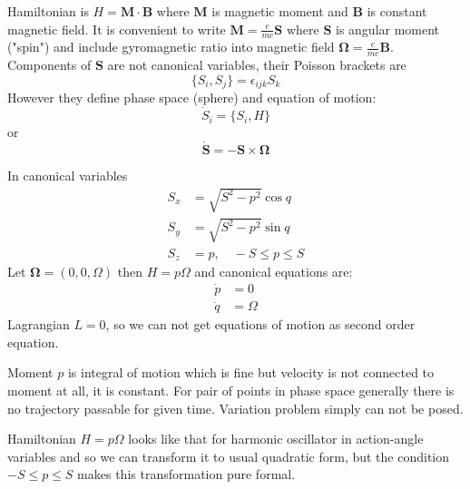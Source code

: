 Hamiltonian is $ H=\bm M \cdot \bm B $ where $\bm M$ is magnetic moment 
and $ \bm B $ is constant magnetic field.
It is convenient to write $ \bm M=\frac{e}{m c}\bm S $ where $ \bm S $
is angular moment ("spin")  and  include gyromagnetic ratio into magnetic field
$ \bm \Omega = \frac{e}{m c}\bm B$. Components of $ \bm S $ are not
canonical variables, their Poisson brackets are
\begin{equation}
   \label {pb}
    \{S_i,S_j\}= \epsilon_{ijk} S_k
\end{equation}
However they define phase space (sphere)  and equation of motion:
\begin{equation}
   \label {sp1}
    \dot S_i=\{S_i,H\}
\end{equation} 
or 
\begin{equation}
   \label {sp2}
    \dot {\bm S} =-\bm S \times \bm \Omega
\end{equation}

In canonical variables 
\begin{equation}
   \label {sp3}
   \begin{split}
       S_x & = \sqrt{S^2-p^2} \cos q \\
       S_y & = \sqrt{S^2-p^2} \sin q \\
       S_z & = p,\quad -S\le p \le S
   \end{split}
\end{equation}
Let $ \bm \Omega =(0,0, \Omega) $ then $ H=p \Omega $ and canonical equations are:
\begin{equation}
   \label {sp4}
   \begin{split}
       \dot p & =0\\
       \dot q & = \Omega
   \end{split}
\end{equation}
Lagrangian $ L=0 $, so we can not get equations of motion as second order equation.

Moment $ p $ is integral of motion which is fine but velocity is not connected to 
moment at all, it is constant. For pair of points in phase space generally there is
no trajectory passable for given time. Variation problem simply can not be posed.

Hamiltonian $ H=p \Omega $ looks like that for harmonic oscillator in
action-angle variables and so we can  transform it to usual quadratic form, but
the condition $  -S\le p \le S$ makes this transformation pure formal.

